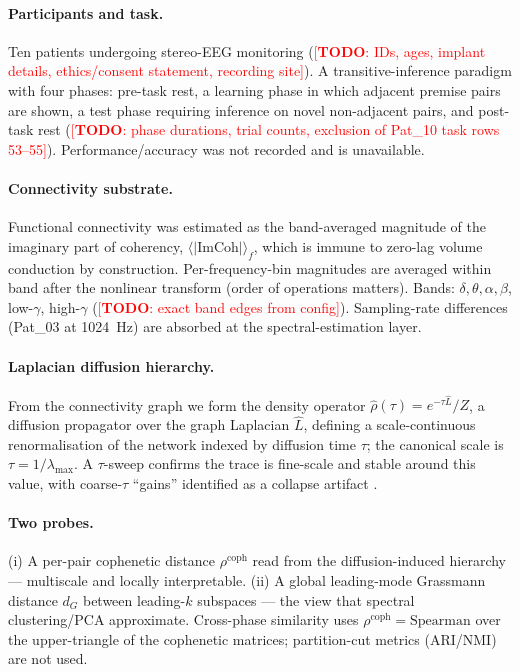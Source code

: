 \documentclass[11pt]{article}
\newcommand{\rhocoph}{\ensuremath{\rho^{\mathrm{coph}}}}
\newcommand{\dG}{\ensuremath{d_{G}}}
\newcommand{\rhat}{\ensuremath{\hat{\rho}(\tau)}}
\newcommand{\TODO}[1]{\textcolor{red}{[\textbf{TODO}: #1]}}
\begin{document}
\paragraph{Participants and task.}
Ten patients undergoing stereo-EEG monitoring
(\TODO{IDs, ages, implant details, ethics/consent statement, recording site}).
A transitive-inference paradigm with four phases: pre-task rest, a learning phase
in which adjacent premise pairs are shown, a test phase requiring inference on
novel non-adjacent pairs, and post-task rest
(\TODO{phase durations, trial counts, exclusion of Pat\_10 task rows 53--55}).
Performance/accuracy was not recorded and is unavailable.

\paragraph{Connectivity substrate.}
Functional connectivity was estimated as the band-averaged magnitude of the
imaginary part of coherency, $\langle|\mathrm{ImCoh}|\rangle_f$, which is immune
to zero-lag volume conduction by construction. Per-frequency-bin magnitudes are
averaged within band after the nonlinear transform (order of operations matters).
Bands: $\delta,\theta,\alpha,\beta$, low-$\gamma$, high-$\gamma$
(\TODO{exact band edges from config}). Sampling-rate differences (Pat\_03 at
1024~Hz) are absorbed at the spectral-estimation layer.

\paragraph{Laplacian diffusion hierarchy.}
From the connectivity graph we form the density operator
$\rhat=e^{-\tau\hat L}/Z$, a diffusion propagator over the graph Laplacian
$\hat L$, defining a scale-continuous renormalisation of the network indexed by
diffusion time $\tau$; the canonical scale is $\tau=1/\lambda_{\max}$. A
$\tau$-sweep confirms the trace is fine-scale and stable around this value, with
coarse-$\tau$ ``gains'' identified as a collapse artifact
.

\paragraph{Two probes.}
(i) A per-pair cophenetic distance \rhocoph{} read from the diffusion-induced
hierarchy --- multiscale and locally interpretable. (ii) A global leading-mode
Grassmann distance \dG{} between leading-$k$ subspaces --- the view that spectral
clustering/PCA approximate. Cross-phase similarity uses
$\rho^{\mathrm{coph}}=\mathrm{Spearman}$ over the upper-triangle of the cophenetic
matrices; partition-cut metrics (ARI/NMI) are not used.
\end{document}
